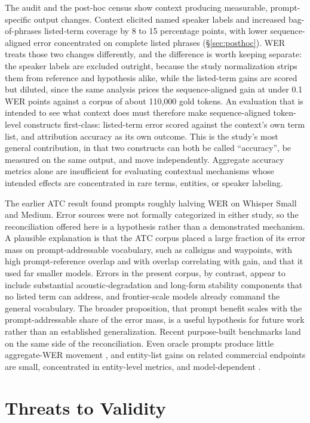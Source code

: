 \documentclass[11pt]{article}
\begin{document}
The audit and the post-hoc census show context producing measurable, prompt-specific output changes. Context elicited named speaker labels and increased bag-of-phrases listed-term coverage by 8 to 15 percentage points, with lower sequence-aligned error concentrated on complete listed phrases (\S\ref{sec:posthoc}). WER treats those two changes differently, and the difference is worth keeping separate: the speaker labels are excluded outright, because the study normalization strips them from reference and hypothesis alike, while the listed-term gains are scored but diluted, since the same analysis prices the sequence-aligned gain at under 0.1 WER points against a corpus of about 110{,}000 gold tokens. An evaluation that is intended to see what context does must therefore make sequence-aligned token-level constructs first-class: listed-term error scored against the context's own term list, and attribution accuracy as its own outcome. This is the study's most general contribution, in that two constructs can both be called ``accuracy'', be measured on the same output, and move independently. Aggregate accuracy metrics alone are insufficient for evaluating contextual mechanisms whose intended effects are concentrated in rare terms, entities, or speaker labeling.

The earlier ATC result \citep{cochran24} found prompts roughly halving WER on Whisper Small and Medium. Error sources were not formally categorized in either study, so the reconciliation offered here is a hypothesis rather than a demonstrated mechanism. A plausible explanation is that the ATC corpus placed a large fraction of its error mass on prompt-addressable vocabulary, such as callsigns and waypoints, with high prompt-reference overlap and with overlap correlating with gain, and that it used far smaller models. Errors in the present corpus, by contrast, appear to include substantial acoustic-degradation and long-form stability components that no listed term can address, and frontier-scale models already command the general vocabulary. The broader proposition, that prompt benefit scales with the prompt-addressable share of the error mass, is a useful hypothesis for future work rather than an established generalization. Recent purpose-built benchmarks land on the same side of the reconciliation. Even oracle prompts produce little aggregate-WER movement \citep{piskala25}, and entity-list gains on related commercial endpoints are small, concentrated in entity-level metrics, and model-dependent \citep{joshi26}.

\section{Threats to Validity}
\label{sec:threats}
\end{document}
